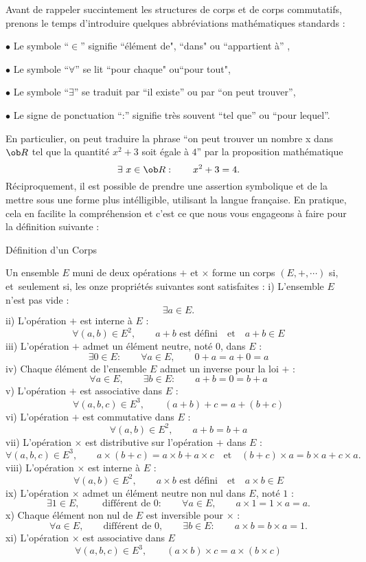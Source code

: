 Avant de rappeler succintement les structures de corps et de corps commutatifs, prenons le temps d'introduire quelques abbr\'eviations math\'ematiques standards : 
\medskip

\item{$\bullet$}
Le symbole ``$\in$'' signifie ``\'el\'ement de", ``dans" ou ``appartient \`a'' ,
\smallskip
\item{$\bullet$}
Le symbole ``$\forall$'' se lit ``pour chaque" ou``pour tout",
\smallskip
\item{$\bullet$}
Le symbole ``$\exists$'' se traduit par ``il existe'' ou par ``on peut trouver'',
\smallskip
\item{$\bullet$}
Le signe de ponctuation ``:'' signifie tr\`es souvent ``tel que'' ou ``pour lequel''. 
\medskip

En particulier, on peut traduire la phrase ``on peut trouver un nombre x dans $\ob R$ tel que la quantit\'e $x^2+3$ soit \'egale \`a $4$'' par la proposition math\'ematique 
$$
\exists\ x\in\ob R:\qquad x^2+3=4. 
$$
R\'eciproquement, il est possible de prendre une assertion symbolique et de la mettre sous une forme plus int\'elligible, utilisant la langue fran\c caise. En pratique, 
cela en facilite la compr\'ehension et c'est ce que nous vous engageons \`a faire pour la d\'efinition suivante : 
\bigskip

\Concept [Index=Structure!Corps] D\'efinition d'un Corps

Un ensemble $E$ muni de deux op\'erations $+$ et $\times$ forme un corps $(E,+,\cdots)$ si, et~seulement si, les onze propri\'et\'es suivantes sont satisfaites :
i) L'ensemble $E$ n'est pas vide : 
$$
\exists a\in E.
$$ 
ii) L'op\'eration $+$ est interne \`a $E$ : 
$$
\forall (a,b)\in E^2, \qquad a+b\mbox{ est d\'efini}\quad\mbox{et}\quad a+b\in E
$$
iii) L'op\'eration $+$ admet un \'el\'ement neutre, not\'e $0$, dans $E$ : 
$$
\exists 0\in E:\qquad \forall a\in E,\qquad 0+a=a+0=a
$$
iv) Chaque \'el\'ement de l'ensemble $E$ admet un inverse pour la loi $+$ : 
$$
\forall a\in E, \qquad \exists b\in E:\qquad a+b=0=b+a
$$
v) L'op\'eration $+$ est associative dans $E$ :
$$
\forall (a,b,c)\in E^3, \qquad(a+b)+c=a+(b+c)
$$ 
vi) L'op\'eration $+$ est commutative dans $E$ : 
$$
\forall (a,b)\in E^2, \qquad a+b=b+a
$$
vii) L'op\'eration $\times$ est distributive sur l'op\'eration $+$ dans $E$ : 
$$
\forall(a,b,c)\in E^3, \qquad a\times(b+c)=a\times b+a\times c\quad\mbox{et}\quad (b+c)\times a=b\times a+c\times a.
$$ 
viii) L'op\'eration $\times$ est interne \`a $E$ : 
$$
\forall (a,b)\in E^2,\qquad a\times b\mbox{ est d\'efini}\quad \mbox{et}\quad a\times b\in E
$$
ix) L'op\'eration $\times$ admet un \'el\'ement neutre non nul dans $E$, not\'e $1$ :
$$
\exists 1\in E, \qquad\mbox{ diff\'erent de }0: \qquad \forall a\in E, \qquad a\times1=1\times a=a.
$$ 
x) Chaque \'el\'ement non nul de $E$ est inversible pour $\times$ : 
$$
\forall a\in E, \qquad\mbox{diff\'erent de }0, \qquad \exists b\in E:\qquad a\times b=b\times a=1. 
$$
xi) L'op\'eration $\times$ est associative dans $E$
$$
\forall (a,b,c)\in E^3, \qquad(a\times b)\times c=a\times(b\times c)
$$ 

